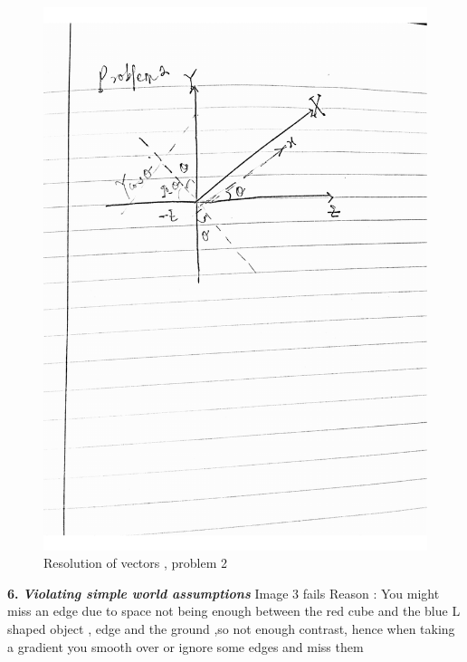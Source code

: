 \documentclass[a4paper,12pt]{article}
\begin{document}
\begin{figure}
  \includegraphics[width=\linewidth]{prob2.pdf}
  \caption{Resolution of vectors , problem 2 }
  \label{fig:Resolution of vectors}
\end{figure}
\newline \textbf{6.} \emph{\textbf{Violating simple world assumptions}}
\newline Image 3 fails
\newline Reason : You might miss an edge due to space not being enough between the red cube and the blue L shaped object , edge and the ground ,so not enough contrast, hence when taking a gradient you smooth over or ignore some edges and miss them
\end{document}
